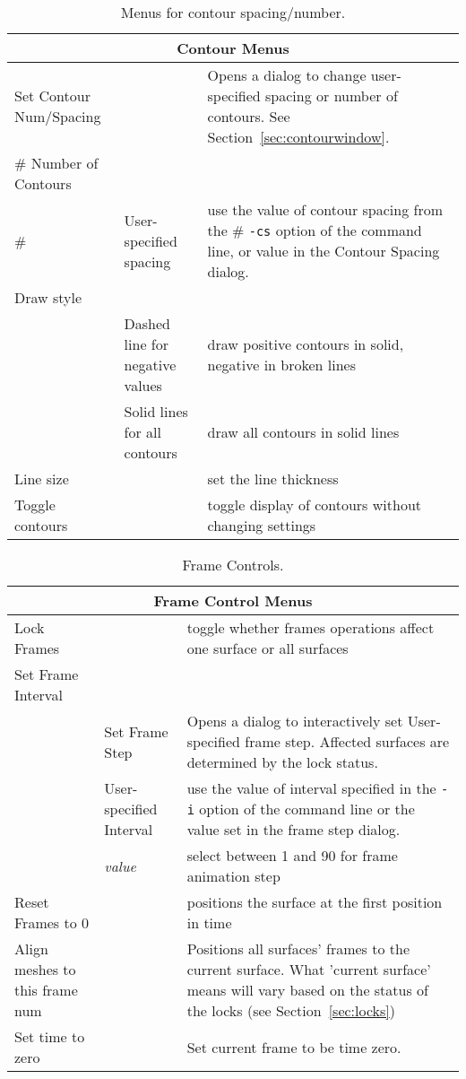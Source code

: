 \begin{table}[ht]
  \begin{center}
    \begin{tabular}{|l|l|p{3 in}|} \hline
      \multicolumn{3}{|c|}{\textbf{Contour Menus}} \\ \hline
    Set Contour Num/Spacing & & Opens a dialog to change user-specified 
    spacing or number of contours. See Section~\ref{sec:contourwindow}.
    \\ 
#    Number of Contours & & \\
#    &  User-specified spacing & use the value of contour spacing from the 
#    \texttt{-cs} option of the command line, or value in the Contour Spacing dialog.  \\
    Draw style & & \\
    & Dashed line for negative values & draw positive contours in solid,
    negative in broken lines\\
    & Solid lines for all contours & draw all contours in solid lines\\
    Line size & & set the line thickness \\ \hline
    Toggle contours & & toggle display of contours
    without changing settings \\ \hline
    \end{tabular}
  \end{center}
\caption{Menus for contour spacing/number.}
\label{table:contours}
\end{table}

\begin{table}[ht]
  \begin{center}
    \begin{tabular}{|l|l|p{2.8 in}|} \hline
      \multicolumn{3}{|c|}{\textbf{Frame Control Menus}} \\ \hline
    Lock Frames  & & toggle whether frames 
        operations affect one surface or all surfaces \\ \hline
    Set Frame Interval & & \\
      & Set Frame Step & Opens a dialog to interactively set User-specified 
    frame step.  Affected surfaces are determined by the lock status.\\
      & User-specified Interval & use the value of interval specified in the 
        \texttt{-i} option of the command line or the value set in the
        frame step dialog.\\ 
      & \emph{value} & select between 1 and 90 for frame animation step \\
    Reset Frames to 0 & & positions the surface at the first position in time
       \\
    Align meshes to this frame num & & Positions all surfaces' frames to the
    current surface.  What 'current surface' means will vary based on the status
    of the locks (see Section~\ref{sec:locks})
    \\
    Set time to zero & & Set current frame to be time zero.
        \\ \hline
    \end{tabular}
  \end{center}
\caption{Frame Controls.}
\end{table}

